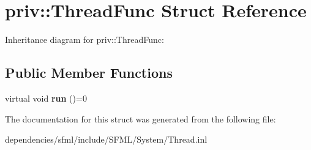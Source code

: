 \hypertarget{structpriv_1_1_thread_func}{}\section{priv\+:\+:Thread\+Func Struct Reference}
\label{structpriv_1_1_thread_func}


Inheritance diagram for priv\+:\+:Thread\+Func\+:
\subsection*{Public Member Functions}
\begin{DoxyCompactItemize}
\item 
\mbox{\label{structpriv_1_1_thread_func_ab5465e714ca4aa92a09bf5e24410a5c3}} 
virtual void {\bfseries run} ()=0
\end{DoxyCompactItemize}


The documentation for this struct was generated from the following file\+:\begin{DoxyCompactItemize}
\item 
dependencies/sfml/include/\+S\+F\+M\+L/\+System/Thread.\+inl\end{DoxyCompactItemize}
